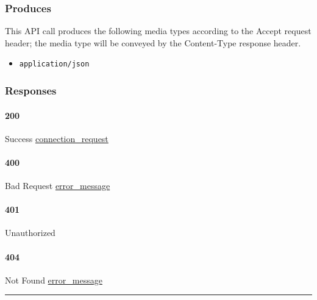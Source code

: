 \hypertarget{produces-5}{%
\subsubsection{Produces}\label{produces-5}}

This API call produces the following media types according to the
{Accept} request header; the media type will be conveyed by the
{Content-Type} response header.

\begin{itemize}
\tightlist
\item
  \texttt{application/json}
\end{itemize}

\hypertarget{responses-5}{%
\subsubsection{Responses}\label{responses-5}}

\hypertarget{section-15}{%
\paragraph{200}\label{section-15}}

Success \protect\hyperlink{connection_request}{connection\_request}

\hypertarget{section-16}{%
\paragraph{400}\label{section-16}}

Bad Request \protect\hyperlink{error_message}{error\_message}

\hypertarget{section-17}{%
\paragraph{401}\label{section-17}}

Unauthorized \protect\hyperlink{}{}

\hypertarget{section-18}{%
\paragraph{404}\label{section-18}}

Not Found \protect\hyperlink{error_message}{error\_message}

\begin{center}\rule{0.5\linewidth}{\linethickness}\end{center}


